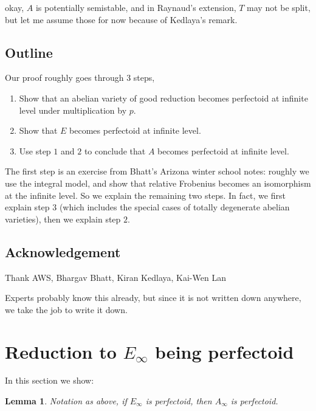 \documentclass[11pt,oneside]{amsart}
\theoremstyle{theorem}
\newtheorem{lemma}[theorem]{Lemma}
\theoremstyle{definition}
\theoremstyle{remark}
\begin{document}
{\color{red} okay, $A$ is potentially semistable, and in Raynaud's extension, $T$ may not be split, but let me assume those for now because of Kedlaya's remark. }



\subsection{Outline}
Our proof roughly goes through 3 steps, 
\begin{enumerate}
\item Show that an abelian variety of good reduction becomes perfectoid at infinite level under multiplication by $p$. 
\item Show that $E$ becomes perfectoid at infinite level. 
\item Use step $1$ and $2$ to conclude that $A$ becomes perfectoid at infinite level. 
\end{enumerate}

The first step is an exercise from Bhatt's Arizona winter school notes: roughly we use the integral model, and show that relative Frobenius becomes an isomorphism at the infinite level. So we explain the remaining two steps. In fact, we first explain step $3$ (which includes the special cases of totally degenerate abelian varieties), then we explain step $2$. 



\subsection{Acknowledgement}

Thank AWS, Bhargav Bhatt, Kiran Kedlaya, Kai-Wen Lan 

Experts probably know this already, but since it is not written down anywhere, we take the job to write it down. 





\section{Reduction to $E_\infty$ being perfectoid}

In this section we show: 

\begin{lemma} \label{lemma:reduction_to_E}
Notation as above, if $E_\infty$ is perfectoid, then $A_\infty$ is perfectoid.  
\end{lemma}
\end{document}
